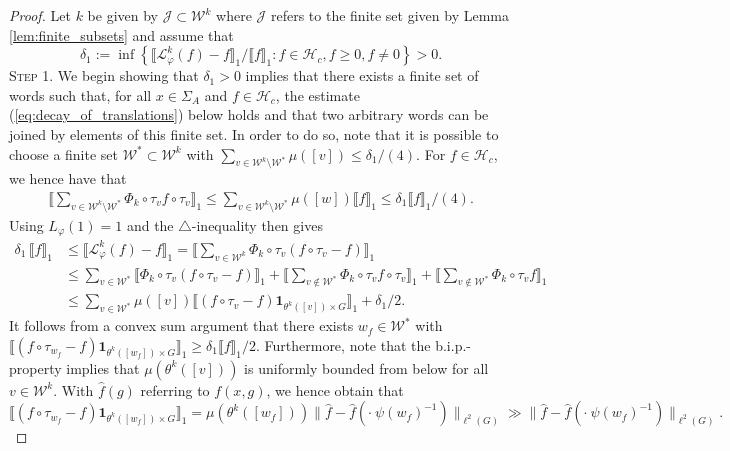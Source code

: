 \documentclass[10pt]{article}
\theoremstyle{mystyle}
\newcommand{\cW}{\mathcal{W}}
\newcommand{\cL}{\mathcal{L}}
\newcommand{\cH}{\mathcal{H}}
\newcommand{\te}{{\theta}}
\newcommand{\Sig}{{\Sigma}}
\newcommand{\1}{\mathbf{1}}
\newcommand{\with}{:}
\begin{document}
\begin{proof} Let $k$ be given by $\mathcal{J}\subset \cW^{k}$ where $\mathcal{J}$ refers to the finite set given by Lemma \ref{lem:finite_subsets} and assume that  
\begin{equation} \nonumber \label{eq:no_almost_eigenfunction} \delta_1 := \inf\left\{\llbracket \cL_\varphi^k(f) - f \rrbracket_1 /\llbracket f \rrbracket_1 \with f \in \cH_c, f\geq 0, f \neq 0 \right\} >0. \end{equation}
\noindent \textsc{Step 1}. We begin showing that $\delta_1>0$ implies that there exists a finite set of words such that, for all $x \in \Sig_A$ and $f \in \cH_c$, the estimate (\ref{eq:decay_of_translations}) below holds and that two arbitrary words can be joined by elements of this finite set. In order to do so, note that it is possible to choose a finite set $\cW^\ast \subset \cW^k$ with 
$ \sum_{v \in \cW^k \setminus \cW^\ast} \mu([v]) \leq {\delta_1}/({4})$. 
For $f \in \mathcal{H}_c$, we hence have that 
\begin{align*}
\llbracket \sum_{v \in \cW^k \setminus \cW^\ast} \Phi_k\circ\tau_v f \circ\tau_v \rrbracket_1 
\leq \sum_{v \in \cW^k \setminus \cW^\ast} \mu([w]) \llbracket f \rrbracket_1 \leq {\delta_1 \llbracket f \rrbracket_1}/({4}).
\end{align*}
Using $L_\varphi(1)=1$ and the $\triangle$-inequality then gives 
\begin{align*}
\delta_1 \, \llbracket f \rrbracket_1& \leq \llbracket \cL_\varphi^k(f) - f \rrbracket_1 = 
\llbracket \sum_{v \in \cW^k} \Phi_k\circ\tau_v(f \circ\tau_v - f) \rrbracket_1 \\
& \leq  \sum_{v \in \cW^\ast} \llbracket \Phi_k\circ\tau_v(f \circ\tau_v - f) \rrbracket_1 + 
\llbracket \sum_{v \notin \cW^\ast}  \Phi_k\circ\tau_v f \circ\tau_v \rrbracket_1 +  \llbracket \sum_{v \notin \cW^\ast} \Phi_k\circ\tau_v f \rrbracket_1  \\
& \leq   \sum_{v \in \cW^\ast} \mu([v]) \llbracket (f\circ \tau_{v} - f)\1_{\te^k([v])\times G} \rrbracket_1 + \delta_1/2.
\end{align*}
It follows from a convex sum argument that there exists $w_f \in  \cW^\ast$ with 
$\llbracket (f\circ \tau_{w_f} - f)\1_{\te^k([w_f])\times G} \rrbracket_1 \geq \delta_1\llbracket f \rrbracket_1/2$. Furthermore, note that the  b.i.p.-property implies that $\mu(\te^k([v]))$ is uniformly bounded from below for all $v \in \cW^k$. 
With $\hat{f}(g)$ referring to $f(x,g)$, we hence obtain that    
\[ \llbracket (f\circ \tau_{w_f} - f)\1_{\te^k([w_f])\times G} \rrbracket_1 = \mu(\te^k([w_f])) \|\hat{f} - \hat{f}(\cdot \ \psi(w_f)^{-1}) \|_{\ell^2(G)} \gg \|\hat{f} - \hat{f}(\cdot \ \psi(w_f)^{-1}) \|_{\ell^2(G)}.\] 

\end{proof}
\end{document}
